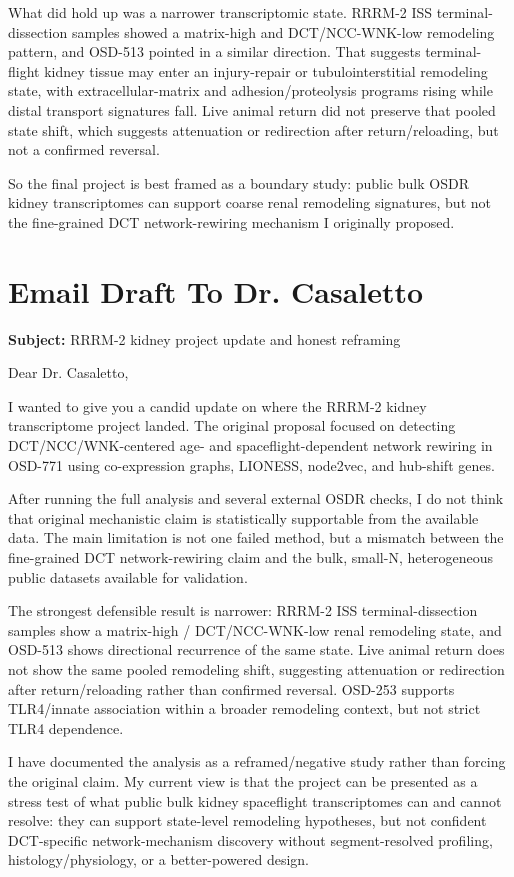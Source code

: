 \documentclass[11pt]{article}
\newcommand{\RRRM}{RRRM-2}
\begin{document}
What did hold up was a narrower transcriptomic state. \RRRM{} ISS terminal-dissection samples showed a matrix-high and DCT/NCC-WNK-low remodeling pattern, and OSD-513 pointed in a similar direction. That suggests terminal-flight kidney tissue may enter an injury-repair or tubulointerstitial remodeling state, with extracellular-matrix and adhesion/proteolysis programs rising while distal transport signatures fall. Live animal return did not preserve that pooled state shift, which suggests attenuation or redirection after return/reloading, but not a confirmed reversal.

So the final project is best framed as a boundary study: public bulk OSDR kidney transcriptomes can support coarse renal remodeling signatures, but not the fine-grained DCT network-rewiring mechanism I originally proposed.

\section*{Email Draft To Dr. Casaletto}

\textbf{Subject:} RRRM-2 kidney project update and honest reframing

Dear Dr. Casaletto,

I wanted to give you a candid update on where the RRRM-2 kidney transcriptome project landed. The original proposal focused on detecting DCT/NCC/WNK-centered age- and spaceflight-dependent network rewiring in OSD-771 using co-expression graphs, LIONESS, node2vec, and hub-shift genes.

After running the full analysis and several external OSDR checks, I do not think that original mechanistic claim is statistically supportable from the available data. The main limitation is not one failed method, but a mismatch between the fine-grained DCT network-rewiring claim and the bulk, small-N, heterogeneous public datasets available for validation.

The strongest defensible result is narrower: RRRM-2 ISS terminal-dissection samples show a matrix-high / DCT/NCC-WNK-low renal remodeling state, and OSD-513 shows directional recurrence of the same state. Live animal return does not show the same pooled remodeling shift, suggesting attenuation or redirection after return/reloading rather than confirmed reversal. OSD-253 supports TLR4/innate association within a broader remodeling context, but not strict TLR4 dependence.

I have documented the analysis as a reframed/negative study rather than forcing the original claim. My current view is that the project can be presented as a stress test of what public bulk kidney spaceflight transcriptomes can and cannot resolve: they can support state-level remodeling hypotheses, but not confident DCT-specific network-mechanism discovery without segment-resolved profiling, histology/physiology, or a better-powered design.
\end{document}
